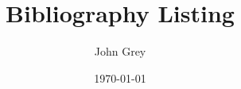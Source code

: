 \documentclass[11pt]{article}
\title{Bibliography Listing}
\date{\today}
\author{John Grey}
\begin{document}
\maketitle
\nocite{*}


\end{document}
